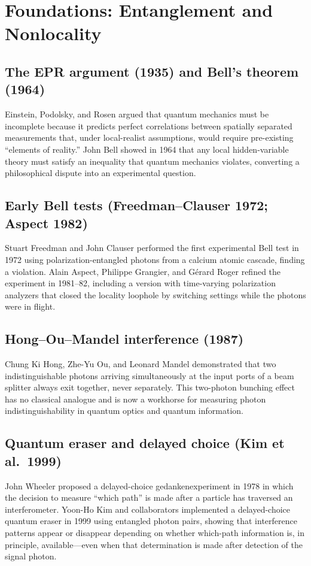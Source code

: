 \documentclass[11pt]{article}
\begin{document}
\section{Foundations: Entanglement and Nonlocality}

\subsection{The EPR argument (1935) and Bell's theorem (1964)}
Einstein, Podolsky, and Rosen argued that quantum mechanics must be incomplete because it predicts perfect correlations between spatially separated measurements that, under local-realist assumptions, would require pre-existing ``elements of reality.'' John Bell showed in 1964 that any local hidden-variable theory must satisfy an inequality that quantum mechanics violates, converting a philosophical dispute into an experimental question.

\subsection{Early Bell tests (Freedman--Clauser 1972; Aspect 1982)}
Stuart Freedman and John Clauser performed the first experimental Bell test in 1972 using polarization-entangled photons from a calcium atomic cascade, finding a violation. Alain Aspect, Philippe Grangier, and G\'erard Roger refined the experiment in 1981--82, including a version with time-varying polarization analyzers that closed the locality loophole by switching settings while the photons were in flight.

\subsection{Hong--Ou--Mandel interference (1987)}
Chung Ki Hong, Zhe-Yu Ou, and Leonard Mandel demonstrated that two indistinguishable photons arriving simultaneously at the input ports of a beam splitter always exit together, never separately. This two-photon bunching effect has no classical analogue and is now a workhorse for measuring photon indistinguishability in quantum optics and quantum information.

\subsection{Quantum eraser and delayed choice (Kim et al.\ 1999)}
John Wheeler proposed a delayed-choice gedankenexperiment in 1978 in which the decision to measure ``which path'' is made after a particle has traversed an interferometer. Yoon-Ho Kim and collaborators implemented a delayed-choice quantum eraser in 1999 using entangled photon pairs, showing that interference patterns appear or disappear depending on whether which-path information is, in principle, available---even when that determination is made after detection of the signal photon.
\end{document}

